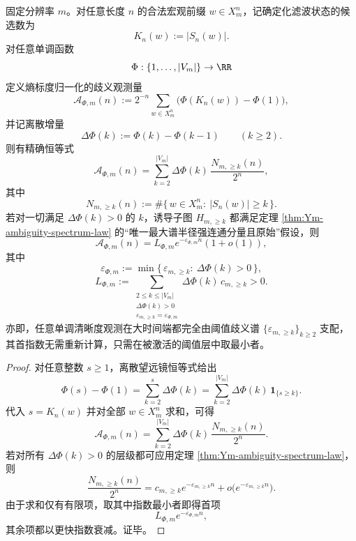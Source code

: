 \begin{theorem}[残余歧义观测的完全谱分解定理]\label{thm:conclusion-statnull-ambiguity-observable-spectral-decomposition}
固定分辨率 \(m\)。对任意长度 \(n\) 的合法宏观前缀 \(w\in X_m^n\)，记确定化滤波状态的候选数为
\[
K_n(w):=|S_n(w)|.
\]
对任意单调函数
\[
\Phi:\{1,\dots,|V_m|\}\to\RR
\]
定义熵标度归一化的歧义观测量
\[
\mathcal A_{\Phi,m}(n):=
2^{-n}\sum_{w\in X_m^n}\bigl(\Phi(K_n(w))-\Phi(1)\bigr),
\]
并记离散增量
\[
\Delta\Phi(k):=\Phi(k)-\Phi(k-1)\qquad (k\ge 2).
\]
则有精确恒等式
\[
\mathcal A_{\Phi,m}(n)
=
\sum_{k=2}^{|V_m|}\Delta\Phi(k)\,\frac{N_{m,\ge k}(n)}{2^n},
\]
其中
\[
N_{m,\ge k}(n):=\#\{\,w\in X_m^n:\ |S_n(w)|\ge k\,\}.
\]
若对一切满足 \(\Delta\Phi(k)>0\) 的 \(k\)，诱导子图 \(H_{m,\ge k}\) 都满足定理 \ref{thm:Ym-ambiguity-spectrum-law} 的“唯一最大谱半径强连通分量且原始”假设，则
\[
\mathcal A_{\Phi,m}(n)
=
L_{\Phi,m}e^{-\varepsilon_{\Phi,m}n}(1+o(1)),
\]
其中
\[
\varepsilon_{\Phi,m}:=
\min\{\,\varepsilon_{m,\ge k}:\ \Delta\Phi(k)>0\,\},
\]
\[
L_{\Phi,m}:=
\sum_{\substack{2\le k\le |V_m|\\ \Delta\Phi(k)>0\\ \varepsilon_{m,\ge k}=\varepsilon_{\Phi,m}}}
\Delta\Phi(k)\,c_{m,\ge k}>0.
\]
亦即，任意单调清晰度观测在大时间端都完全由阈值歧义谱 \(\{\varepsilon_{m,\ge k}\}_{k\ge 2}\) 支配，其首指数无需重新计算，只需在被激活的阈值层中取最小者。
\end{theorem}
\begin{proof}
对任意整数 \(s\ge 1\)，离散望远镜恒等式给出
\[
\Phi(s)-\Phi(1)
=
\sum_{k=2}^{s}\Delta\Phi(k)
=
\sum_{k=2}^{|V_m|}\Delta\Phi(k)\,\mathbf 1_{\{s\ge k\}}.
\]
代入 \(s=K_n(w)\) 并对全部 \(w\in X_m^n\) 求和，可得
\[
\mathcal A_{\Phi,m}(n)
=
\sum_{k=2}^{|V_m|}\Delta\Phi(k)\,\frac{N_{m,\ge k}(n)}{2^n}.
\]
若对所有 \(\Delta\Phi(k)>0\) 的层级都可应用定理 \ref{thm:Ym-ambiguity-spectrum-law}，则
\[
\frac{N_{m,\ge k}(n)}{2^n}
=
c_{m,\ge k}e^{-\varepsilon_{m,\ge k}n}
+o\!\bigl(e^{-\varepsilon_{m,\ge k}n}\bigr).
\]
由于求和仅有有限项，取其中指数最小者即得首项
\[
L_{\Phi,m}e^{-\varepsilon_{\Phi,m}n},
\]
其余项都以更快指数衰减。证毕。
\end{proof}

